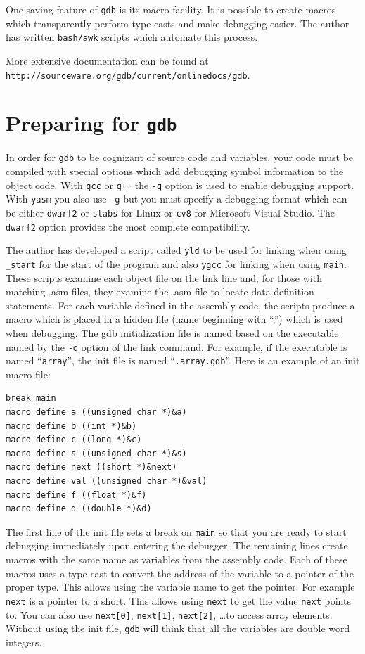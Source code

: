\documentclass[11pt,b5paper]{book}
\begin{document}
One saving feature of {\tt gdb} is its macro facility.
It is possible to create macros which transparently perform type casts and make debugging easier.
The author has written {\tt bash/awk} scripts which automate this process.

More extensive documentation can be found at \\
{\tt http://sourceware.org/gdb/current/onlinedocs/gdb}.

\section{Preparing for {\tt gdb}}

In order for {\tt gdb} to be cognizant of source code and variables, your code must be compiled with
special options which add debugging symbol information to the object code.
With {\tt gcc} or {\tt g++} the {\tt -g} option is used to enable debugging support.
With {\tt yasm} you also use {\tt -g} but you must specify a debugging format which can be either
{\tt dwarf2} or {\tt stabs} for Linux or {\tt cv8} for Microsoft Visual Studio.  
The {\tt dwarf2} option provides the most complete compatibility.

The author has developed a script called {\tt yld} to be used for linking when using {\tt \_start} for the  
start of the program and also {\tt ygcc} for linking when using {\tt main}.
These scripts examine each object file on the link line and, for those with matching .asm files, they
examine the .asm file to locate data definition statements.
For each variable defined in the assembly code, the scripts produce a macro which is placed in a hidden file
(name beginning with ``.'') which is used when debugging.
The gdb initialization file is named based on the executable named by the {\tt -o} option of the link command.
For example, if the executable is named ``{\tt array}'', the init file is named ``{\tt .array.gdb}''.
Here is an example of an init macro file:
\begin{verbatim}
break main
macro define a ((unsigned char *)&a)
macro define b ((int *)&b)
macro define c ((long *)&c)
macro define s ((unsigned char *)&s)
macro define next ((short *)&next)
macro define val ((unsigned char *)&val)
macro define f ((float *)&f)
macro define d ((double *)&d)
\end{verbatim}

The first line of the init file sets a break on {\tt main} so that you are ready to start debugging
immediately upon entering the debugger.
The remaining lines create macros with the same name as variables from the assembly code.
Each of these macros uses a type cast to convert the address of the variable to a pointer of the proper
type.
This allows using the variable name to get the pointer.
For example {\tt next} is a pointer to a short.
This allows using {\tt *next} to get the value {\tt next} points to.
You can also use {\tt next[0]}, {\tt next[1]}, {\tt next[2]}, \ldots to access array elements.
Without using the init file, {\tt gdb} will think that all the variables are double word integers.
\end{document}
